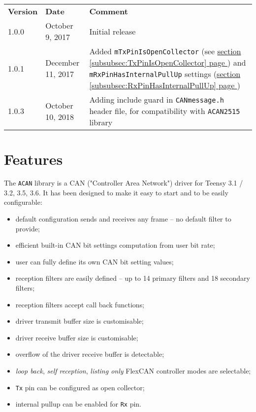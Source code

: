 \documentclass[10pt, a4paper, obeyspaces, openany]{extarticle}
\newcommand\refSubsubsectionPage[1]{\hyperref[subsubsec:#1]{section \ref*{subsubsec:#1} page \pageref{subsubsec:#1}}}
\begin{document}
\begin{center}
  \begin{tabular}{llp{10cm}}
    \textbf{Version} & \textbf{Date} & \textbf{Comment}\\
    1.0.0 & October 9, 2017 & Initial release \\
    1.0.1 & December 11, 2017 & Added \texttt{mTxPinIsOpenCollector} (see \refSubsubsectionPage{TxPinIsOpenCollector}) and \texttt{mRxPinHasInternalPullUp} settings (\refSubsubsectionPage{RxPinHasInternalPullUp}) \\
    1.0.3 & October 10, 2018 & Adding include guard in \texttt{CANmessage.h} header file, for compatibility with \texttt{ACAN2515} library
  \end{tabular}
\end{center}

\section{Features}

The \texttt{ACAN} library is a CAN ("Controller Area Network") driver for Teensy 3.1 / 3.2, 3.5, 3.6. It has been designed to make it easy to start and to be easily configurable:
\begin{itemize}
  \item default configuration sends and receives any frame -- no default filter to provide;
  \item efficient built-in CAN bit settings computation from user bit rate;
  \item user can fully define its own CAN bit setting values;
  \item reception filters are easily defined -- up to 14 primary filters and 18 secondary filters;
  \item reception filters accept call back functions;
  \item driver transmit buffer size is customisable;
  \item driver receive buffer size is customisable;
  \item overflow of the driver receive buffer is detectable;
  \item \emph{loop back}, \emph{self reception}, \emph{listing only} FlexCAN controller modes are selectable;
  \item \texttt{Tx} pin can be configured as open collector;
  \item internal pullup can be enabled for \texttt{Rx} pin.
\end{itemize}
\end{document}
